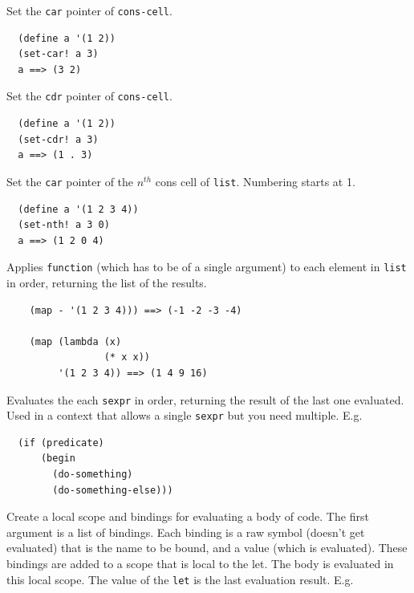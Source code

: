 \documentclass[12pt]{article}
\begin{document}

Set the \verb|car| pointer of \verb|cons-cell|.

\begin{verbatim}
  (define a '(1 2))
  (set-car! a 3)
  a ==> (3 2)
\end{verbatim}


Set the \verb|cdr| pointer of \verb|cons-cell|.

\begin{verbatim}
  (define a '(1 2))
  (set-cdr! a 3)
  a ==> (1 . 3)
\end{verbatim}


Set the \verb|car| pointer of the $n^{th}$ cons cell of \verb|list|. Numbering starts at 1.

\begin{verbatim}
  (define a '(1 2 3 4))
  (set-nth! a 3 0)
  a ==> (1 2 0 4)
\end{verbatim}


Applies \verb|function| (which has to be of a single argument) to each
element in \verb|list| in order, returning the list of the results.

\begin{verbatim}
    (map - '(1 2 3 4))) ==> (-1 -2 -3 -4)

    (map (lambda (x)
                 (* x x))
         '(1 2 3 4)) ==> (1 4 9 16)
\end{verbatim}


Evaluates the each \verb|sexpr| in order, returning the result of the
last one evaluated. Used in a context that allows a single
\verb|sexpr| but you need multiple. E.g.

\begin{verbatim}
  (if (predicate)
      (begin
        (do-something)
        (do-something-else)))
\end{verbatim}


Create a local scope and bindings for evaluating a body of code. The
first argument is a list of bindings. Each binding is a raw symbol
(doesn't get evaluated) that is the name to be bound, and a value
(which is evaluated). These bindings are added to a scope that is
local to the let. The body is evaluated in this local scope. The value
of the \verb|let| is the last evaluation result. E.g.
\end{document}
